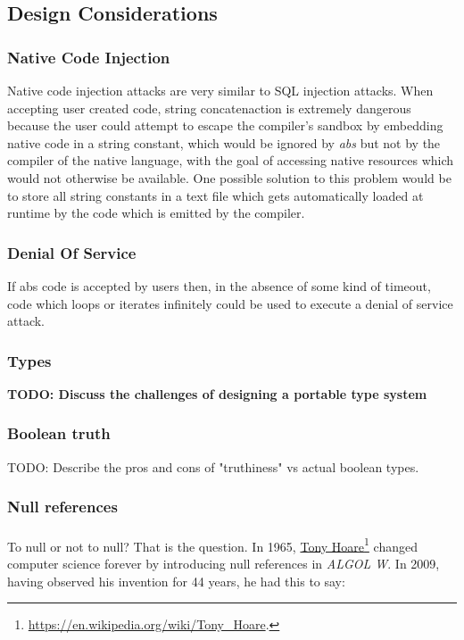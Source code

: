\documentclass[hidelinks]{article}
\begin{document}
\subsection{Design Considerations}
\subsubsection{Native Code Injection}
Native code injection attacks are very similar to SQL injection attacks. When accepting user created code, string concatenaction is extremely dangerous because the user could attempt to escape the compiler's sandbox by embedding native code in a string constant, which would be ignored by \textit{abs} but not by the compiler of the native language, with the goal of accessing native resources which would not otherwise be available. One possible solution to this problem would be to store all string constants in a text file which gets automatically loaded at runtime by the code which is emitted by the compiler.
\subsubsection{Denial Of Service}
If abs code is accepted by users then, in the absence of some kind of timeout, code which loops or iterates infinitely could be used to execute a denial of service attack.
\subsubsection{Types}
\textbf{TODO: Discuss the challenges of designing a portable type system}
\subsubsection{Boolean truth}
TODO: Describe the pros and cons of "truthiness" vs actual boolean types.
\subsubsection{Null references}
\paragraph{}To null or not to null? That is the question. In 1965, \href{https://en.wikipedia.org/wiki/Tony_Hoare}{{\color{blue}Tony Hoare}}\footnote{\url{https://en.wikipedia.org/wiki/Tony_Hoare}.} changed computer science forever by introducing null references in \textit{ALGOL W}. In 2009, having observed his invention for 44 years, he had this to say:
\end{document}
